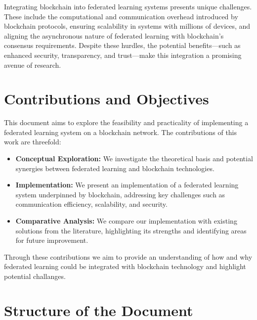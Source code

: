 Integrating blockchain into federated learning systems presents unique challenges. These include the
computational and communication overhead introduced by blockchain protocols, ensuring scalability in systems
with millions of devices, and aligning the asynchronous nature of federated learning with blockchain's
consensus requirements. Despite these hurdles, the potential benefits—such as enhanced security,
transparency, and trust—make this integration a promising avenue of research.

\section{Contributions and Objectives}

This document aims to explore the feasibility and practicality of implementing a federated learning system on
a blockchain network. The contributions of this work are threefold:

\begin{itemize}
  \item \textbf{Conceptual Exploration:} We investigate the theoretical basis and potential synergies between
    federated learning and blockchain technologies.
  \item \textbf{Implementation:} We present an implementation of a federated learning system underpinned by
    blockchain, addressing key challenges such as communication efficiency, scalability, and security.
  \item \textbf{Comparative Analysis:} We compare our implementation with existing solutions from the
    literature, highlighting its strengths and identifying areas for future improvement.
\end{itemize}

Through these contributions we aim to provide an understanding of how and why federated learning could be
integrated with blockchain technology and highlight potential challanges.

\section{Structure of the Document}

